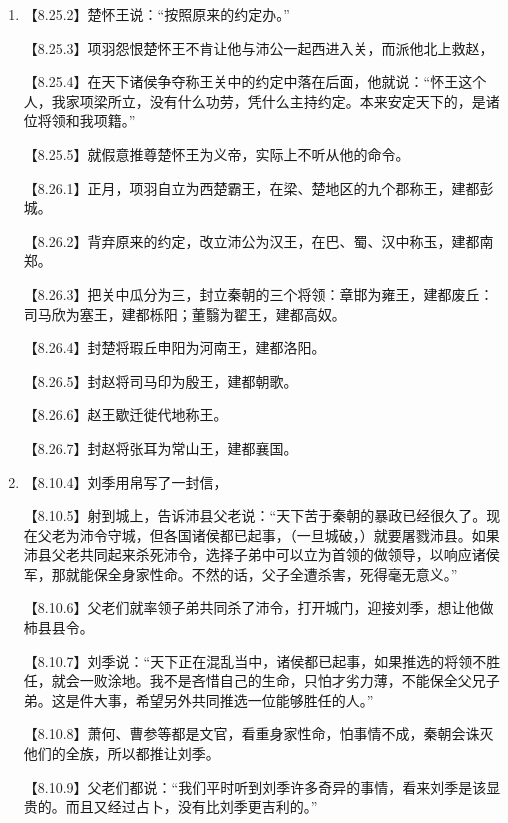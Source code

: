 \documentclass[fontset=none,11pt,a4paper]{ctexart}
\begin{document}
\begin{enumerate}[label=\Alph*.]
  \item
\noindent 【8.25.2】楚怀王说：“按照原来的约定办。”\par
\noindent 【8.25.3】项羽怨恨楚怀王不肯让他与沛公一起西进入关，而派他北上救赵，\par
\noindent 【8.25.4】在天下诸侯争夺称王关中的约定中落在后面，他就说：“怀王这个人，我家项梁所立，没有什么功劳，凭什么主持约定。本来安定天下的，是诸位将领和我项籍。”\par
\noindent 【8.25.5】就假意推尊楚怀王为义帝，实际上不听从他的命令。\par
\noindent 【8.26.1】正月，项羽自立为西楚霸王，在梁、楚地区的九个郡称王，建都彭城。\par
\noindent 【8.26.2】背弃原来的约定，改立沛公为汉王，在巴、蜀、汉中称玉，建都南郑。\par
\noindent 【8.26.3】把关中瓜分为三，封立秦朝的三个将领：章邯为雍王，建都废丘：司马欣为塞王，建都栎阳；董翳为翟王，建都高奴。\par
\noindent 【8.26.4】封楚将瑕丘申阳为河南王，建都洛阳。\par
\noindent 【8.26.5】封赵将司马印为殷王，建都朝歌。\par
\noindent 【8.26.6】赵王歇迁徙代地称王。\par
\noindent 【8.26.7】封赵将张耳为常山王，建都襄国。\par
  \item
\noindent 【8.10.4】刘季用帛写了一封信，\par
\noindent 【8.10.5】射到城上，告诉沛县父老说：“天下苦于秦朝的暴政已经很久了。现在父老为沛令守城，但各国诸侯都已起事，（一旦城破，）就要屠戮沛县。如果沛县父老共同起来杀死沛令，选择子弟中可以立为首领的做领导，以响应诸侯军，那就能保全身家性命。不然的话，父子全遭杀害，死得毫无意义。”\par
\noindent 【8.10.6】父老们就率领子弟共同杀了沛令，打开城门，迎接刘季，想让他做柿县县令。\par
\noindent 【8.10.7】刘季说：“天下正在混乱当中，诸侯都已起事，如果推选的将领不胜任，就会一败涂地。我不是吝惜自己的生命，只怕才劣力薄，不能保全父兄子弟。这是件大事，希望另外共同推选一位能够胜任的人。”\par
\noindent 【8.10.8】萧何、曹参等都是文官，看重身家性命，怕事情不成，秦朝会诛灭他们的全族，所以都推让刘季。\par
\noindent 【8.10.9】父老们都说：“我们平时听到刘季许多奇异的事情，看来刘季是该显贵的。而且又经过占卜，没有比刘季更吉利的。”\par

\end{enumerate}
\end{document}

